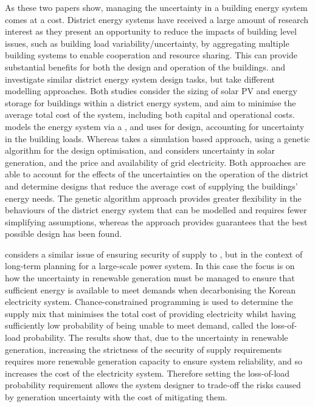 As these two papers show, managing the uncertainty in a building energy system comes at a cost. District energy systems have received a large amount of research interest as they present an opportunity to reduce the impacts of building level issues, such as building load variability/uncertainty, by aggregating multiple building systems to enable cooperation and resource sharing. This can provide substantial benefits for both the design and operation of the buildings.  and  investigate similar district energy system design tasks, but take different modelling approaches. Both studies consider the sizing of solar PV and energy storage for buildings within a district energy system, and aim to minimise the average total cost of the system, including both capital and operational costs.  models the energy system via a , and uses  for design, accounting for uncertainty in the building loads. Whereas  takes a simulation based approach, using a genetic algorithm for the design optimisation, and considers uncertainty in solar generation, and the price and availability of grid electricity. Both approaches are able to account for the effects of the uncertainties on the operation of the district and determine designs that reduce the average cost of supplying the buildings' energy needs. The genetic algorithm approach provides greater flexibility in the behaviours of the district energy system that can be modelled and requires fewer simplifying assumptions, whereas the  approach provides guarantees that the best possible design has been found.

 considers a similar issue of ensuring security of supply to , but in the context of long-term planning for a large-scale power system. In this case the focus is on how the uncertainty in renewable generation must be managed to ensure that sufficient energy is available to meet demands when decarbonising the Korean electricity system. Chance-constrained programming is used to determine the supply mix that minimises the total cost of providing electricity whilst having sufficiently low probability of being unable to meet demand, called the loss-of-load probability. The results show that, due to the uncertainty in renewable generation, increasing the strictness of the security of supply requirements requires more renewable generation capacity to ensure system reliability, and so increases the cost of the electricity system. Therefore setting the loss-of-load probability requirement allows the system designer to trade-off the risks caused by generation uncertainty with the cost of mitigating them.\\

